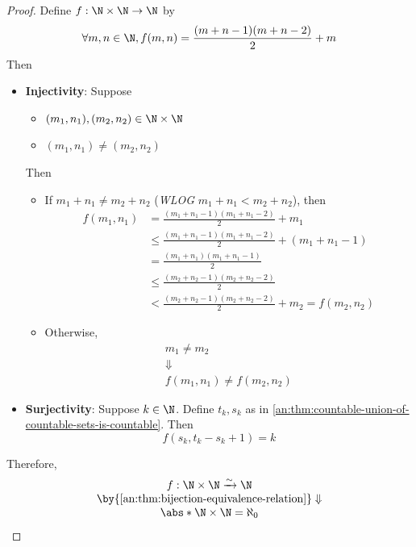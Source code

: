 \begin{proof}
  Define $f: \N \times \N \to \N$ by
  \[
    \forall m, n \in \N, f(m, n) = \frac{(m + n - 1)(m + n - 2)}{2} + m
  \]
  Then
  \begin{itemize}
    \item \textbf{Injectivity}: Suppose
          \begin{itemize}
            \item $(m_{1}, n_{1}), (m_{2}, n_{2}) \in \N \times \N$
            \item $(m_{1}, n_{1}) \neq (m_{2}, n_{2})$
          \end{itemize}
          Then
          \begin{itemize}
            \item If $m_{1} + n_{1} \neq m_{2} + n_{2}$ (\emph{WLOG} $m_{1} + n_{1} < m_{2} + n_{2}$), then
                  \begin{align*}
                    f(m_{1}, n_{1}) & = \frac{(m_{1} + n_{1} - 1)(m_{1} + n_{1} - 2)}{2} + m_{1}                   \\
                                    & \leq \frac{(m_{1} + n_{1} - 1)(m_{1} + n_{1} - 2)}{2} + (m_{1} + n_{1} - 1)  \\
                                    & = \frac{(m_{1} + n_{1})(m_{1} + n_{1} - 1)}{2}                               \\
                                    & \leq \frac{(m_{2} + n_{2} - 1)(m_{2} + n_{2} - 2)}{2}                        \\
                                    & < \frac{(m_{2} + n_{2} - 1)(m_{2} + n_{2} - 2)}{2} + m_{2} = f(m_{2}, n_{2})
                  \end{align*}
            \item Otherwise,
                  \[
                    \begin{array}{c}
                      m_{1} \neq m_{2} \\
                      \Downarrow       \\
                      f(m_{1}, n_{1}) \neq f(m_{2}, n_{2})
                    \end{array}
                  \]
          \end{itemize}
    \item \textbf{Surjectivity}: Suppose $k \in \N$. Define $t_{k}, s_{k}$ as in
          \cref{an:thm:countable-union-of-countable-sets-is-countable}. Then
          \[
            f(s_{k}, t_{k} - s_{k} + 1) =  k
          \]
  \end{itemize}
  Therefore,
  \[
    \begin{array}{c}
      f: \N \times \N \xrightarrow{\sim} \N                        \\
      \by{\Cref{an:thm:bijection-equivalence-relation}} \Downarrow \\
      \abs*{\N \times \N} = \aleph_{0}
    \end{array}
  \]
\end{proof}

